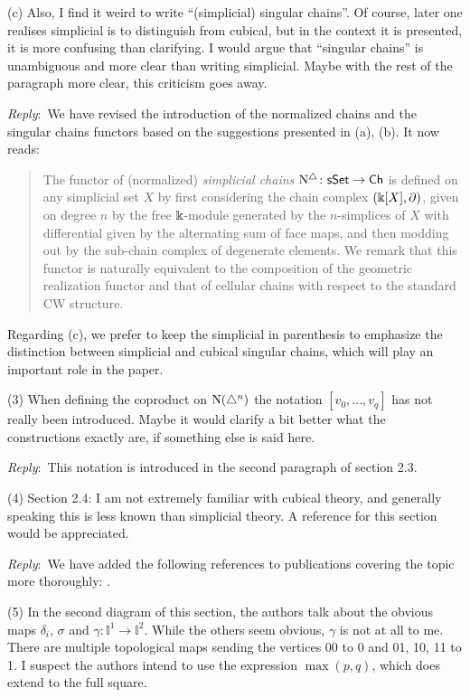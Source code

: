 \documentclass{amsart}
\newcommand{\ar}{\medskip\noindent\textit{Reply}:\ }
\newcommand{\rp}{\medskip\noindent}
\begin{document}
	\rp (c) Also, I find it weird to write “(simplicial) singular chains”. Of course, later one realises simplicial is to distinguish from cubical, but in the context it is presented, it is more confusing than clarifying. I would	argue that “singular chains” is unambiguous and more clear than writing simplicial. Maybe with the rest of the paragraph more clear, this criticism goes away.

	\ar We have revised the introduction of the normalized chains and the singular chains functors based on the suggestions presented in (a), (b).
	It now reads:

	\begin{quote}
		The functor of (normalized) \textit{simplicial chains} $\operatorname{N^{\triangle}} \colon \mathsf{sSet} \to \mathsf{Ch}$ is defined on any simplicial set $X$ by first considering the chain complex $(\Bbbk[X], \partial)$, given on degree $n$ by the free $\Bbbk$-module generated by the $n$-simplices of $X$ with differential given by the alternating sum of face maps, and then modding out by the sub-chain complex of degenerate elements.
		We remark that this functor is naturally equivalent to the composition of the geometric realization functor and that of cellular chains with respect to the standard CW structure.
	\end{quote}

	Regarding (c), we prefer to keep the simplicial in parenthesis to emphasize the distinction between simplicial and cubical singular chains, which will play an important role in the paper.

	\rp (3) When defining the coproduct on $\operatorname{N}(\triangle^n)$ the notation $[v_0,...,v_q]$ has not really been introduced.
	Maybe it would clarify a bit better what the constructions exactly are, if something else is said here.

	\ar This notation is introduced in the second paragraph of section 2.3.

	\rp (4) Section 2.4: I am not extremely familiar with cubical theory, and generally	speaking this is less known than simplicial theory.
	A reference for this section would be appreciated.

	\ar We have added the following references to publications covering the topic more thoroughly: \cite{grandis2003cubical,medina2022cube_einfty,medina2023flowing}.

	\rp (5) In the second diagram of this section, the authors talk about the obvious maps $\delta_i$, $\sigma$ and $\gamma \colon \mathbb{I}^1 \to \mathbb{I}^2$.
	While the others seem obvious, $\gamma$ is not at all to me. There are multiple topological maps sending the vertices 00 to 0 and 01, 10, 11 to 1.
	I suspect the authors intend to use the expression $\max(p, q)$, which does extend to the full square.
\end{document}
